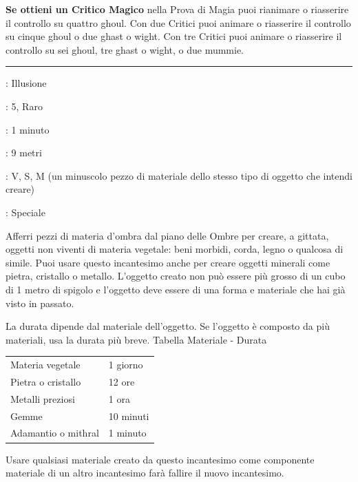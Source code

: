 \begin{multicols}{2}
\textbf{Se ottieni un Critico Magico} nella Prova di Magia puoi rianimare o riasserire il controllo su quattro ghoul. Con due Critici puoi animare o riasserire il controllo su cinque ghoul o due ghast o wight. Con tre Critici puoi animare o riasserire il controllo su sei ghoul, tre ghast o wight, o due mummie.

\smallskip\noindent\rule{\linewidth}{2pt} \hypertarget{Creazione}{}\smallskip{}
\noindent
\begin{description}[noitemsep, topsep=0pt, parsep=0pt, partopsep=0pt, leftmargin=0cm, labelwidth=2.8cm]
	\item[\textbf{Lista di Magia}]: Illusione
	\item[\textbf{Livello}]: 5, Raro
	\item[\textbf{T. di Lancio}]: 1 minuto
	\item[\textbf{Gittata}]: 9 metri
	\item[\textbf{Componenti}]: V, S, M (un minuscolo pezzo di materiale dello stesso tipo di oggetto che intendi creare)
	\item[\textbf{Durata}]: Speciale
\end{description}

Afferri pezzi di materia d'ombra dal piano delle Ombre per creare, a gittata, oggetti non viventi di materia vegetale: beni morbidi, corda, legno o qualcosa di simile. Puoi usare questo incantesimo anche per creare oggetti minerali come pietra, cristallo o metallo. L'oggetto creato non può essere più grosso di un cubo di 1 metro di spigolo e l'oggetto deve essere di una forma e materiale che hai già visto in passato.

La durata dipende dal materiale dell'oggetto. Se l'oggetto è composto da più materiali, usa la durata più breve.
\medskip
Tabella Materiale - Durata
\medskip

\begin{tabularx}{0.45\textwidth}{lX}
	\hline
	Materia vegetale &1 giorno\\
	Pietra o cristallo &12 ore\\
	Metalli preziosi &1 ora\\
	Gemme &10 minuti\\
	Adamantio o mithral &1 minuto
\end{tabularx}
\medskip

Usare qualsiasi materiale creato da questo incantesimo come componente materiale di un altro incantesimo farà fallire il nuovo incantesimo.


\end{multicols}

